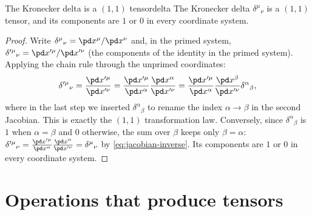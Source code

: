 \begin{proposition}{The Kronecker delta is a $(1,1)$ tensor}{delta}
The Kronecker delta $\delta^\mu{}_\nu$ is a $(1,1)$ tensor, and its components are $1$ or $0$ in every coordinate system.
\end{proposition}
\begin{proof}
Write $\delta^\mu{}_\nu=\pd x^\mu/\pd x^\nu$ and, in the primed system, $\delta'^\mu{}_\nu=\pd x'^\mu/\pd x'^\nu$ (the components of the identity in the primed system). Applying the chain rule through the unprimed coordinates:
\[
  \delta'^\mu{}_\nu=\frac{\pd x'^\mu}{\pd x'^\nu}=\frac{\pd x'^\mu}{\pd x^\alpha}\frac{\pd x^\alpha}{\pd x'^\nu}
  =\frac{\pd x'^\mu}{\pd x^\alpha}\frac{\pd x^\beta}{\pd x'^\nu}\delta^\alpha{}_\beta ,
\]
where in the last step we inserted $\delta^\alpha{}_\beta$ to rename the index $\alpha\to\beta$ in the second Jacobian. This is exactly the $(1,1)$ transformation law. Conversely, since $\delta^\alpha{}_\beta$ is $1$ when $\alpha=\beta$ and $0$ otherwise, the sum over $\beta$ keeps only $\beta=\alpha$: $\delta'^\mu{}_\nu=\frac{\pd x'^\mu}{\pd x^\alpha}\frac{\pd x^\alpha}{\pd x'^\nu}=\delta^\mu{}_\nu$ by \eqref{eq:jacobian-inverse}. Its components are $1$ or $0$ in every coordinate system.
\end{proof}

\section{Operations that produce tensors}

